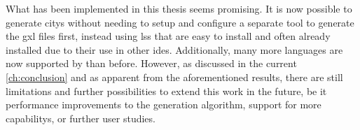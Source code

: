 \documentclass[../thesis]{subfiles}
\begin{document}
What has been implemented in this thesis seems promising.
It is now possible to generate \glspl{city} without needing to setup and configure a separate tool to generate the \gls{gxl} files first, instead using \glspl{ls} that are easy to install and often already installed due to their use in other \glspl{ide}.
Additionally, many more languages are now supported by \SEE{} than before.
However, as discussed in the current \cref{ch:conclusion} and as apparent from the aforementioned results, there are still limitations and further possibilities to extend this work in the future, be it performance improvements to the generation algorithm, support for more \glspl{capability}, or further user studies.

\end{document}
